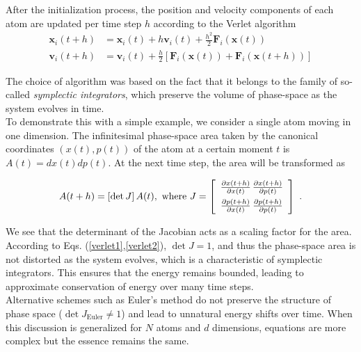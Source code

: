 \documentclass[twocolumn,10pt]{article}
\begin{document}
After the initialization process, the position and velocity components of each atom are updated per time step $h$ according to the Verlet algorithm \cite{verlet}
\begin{align}
   \mathbf{x}_i(t+h) &= \mathbf{x}_i(t) + h\mathbf{v}_i(t) + \frac{h^2}{2}\mathbf{F}_i(\mathbf{x}(t))
   \label{verlet1}
   \\
   \mathbf{v}_i(t+h) &= \mathbf{v}_i(t) + \frac{h}{2}\left[\mathbf{F}_i(\mathbf{x}(t)) + \mathbf{F}_i(\mathbf{x}(t+h)) \right]    
   \label{verlet2}
\end{align}

The choice of algorithm was based on the fact that it belongs to the family of so-called \textit{symplectic integrators}, which preserve the volume of phase-space as the system evolves in time.\\

To demonstrate this with a simple example, we consider a single atom moving in one dimension. The infinitesimal phase-space area taken by the canonical coordinates $(x(t),p(t))$ of the atom at a certain moment $t$ is $A(t) = dx(t)dp(t)$. At the next time step, the area will be transformed as 

\begin{equation}
    A(t+h) = \left[\det J\right] A(t), \ \text{where} \
    J = \left[ \begin{array}{c@{\hspace{0.5mm}}c}  %
        \frac{\partial x(t+h)}{\partial x(t)} & \frac{\partial x(t+h)}{\partial p(t)}\\[2mm] 
        \frac{\partial p(t+h)}{\partial x(t)} & \frac{\partial p(t+h)}{\partial p(t)} 
\end{array}
\right] \ .
\end{equation}

We see that the determinant of the Jacobian acts as a scaling factor for the area. According to Eqs. (\ref{verlet1},\ref{verlet2}), $\det J = 1$, and thus the phase-space area is not distorted as the system evolves, which is a characteristic of symplectic integrators. This ensures that the energy remains bounded, leading to approximate conservation of energy over many time steps.\\

Alternative schemes such as Euler's method do not preserve the structure of phase space ($\det J_{\text{Euler}} \neq 1$) and lead to unnatural energy shifts over time. When this discussion is generalized for $N$ atoms and $d$ dimensions, equations are more complex but the essence remains the same.
\end{document}
